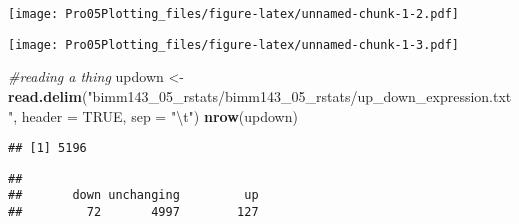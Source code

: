 \documentclass[]{article}
\newenvironment{Shaded}{\begin{snugshade}}{\end{snugshade}}
\newcommand{\CharTok}[1]{\textcolor[rgb]{0.31,0.60,0.02}{#1}}
\newcommand{\CommentTok}[1]{\textcolor[rgb]{0.56,0.35,0.01}{\textit{#1}}}
\newcommand{\DataTypeTok}[1]{\textcolor[rgb]{0.13,0.29,0.53}{#1}}
\newcommand{\KeywordTok}[1]{\textcolor[rgb]{0.13,0.29,0.53}{\textbf{#1}}}
\newcommand{\NormalTok}[1]{#1}
\newcommand{\OperatorTok}[1]{\textcolor[rgb]{0.81,0.36,0.00}{\textbf{#1}}}
\newcommand{\OtherTok}[1]{\textcolor[rgb]{0.56,0.35,0.01}{#1}}
\newcommand{\StringTok}[1]{\textcolor[rgb]{0.31,0.60,0.02}{#1}}
\begin{document}
\texttt{[image: Pro05Plotting\_files/figure-latex/unnamed-chunk-1-2.pdf]}

\begin{Shaded}
\end{Shaded}

\texttt{[image: Pro05Plotting\_files/figure-latex/unnamed-chunk-1-3.pdf]}

\begin{Shaded}
\begin{Highlighting}[]
\CommentTok{#reading a thing}
\NormalTok{updown <-}\StringTok{ }\KeywordTok{read.delim}\NormalTok{(}\StringTok{"bimm143_05_rstats/bimm143_05_rstats/up_down_expression.txt"}\NormalTok{,}
                     \DataTypeTok{header =} \OtherTok{TRUE}\NormalTok{,}
                     \DataTypeTok{sep =} \StringTok{"}\CharTok{\textbackslash{}t}\StringTok{"}\NormalTok{)}
\KeywordTok{nrow}\NormalTok{(updown)}
\end{Highlighting}
\end{Shaded}

\begin{verbatim}
## [1] 5196
\end{verbatim}

\begin{Shaded}
\end{Shaded}

\begin{verbatim}
## 
##       down unchanging         up 
##         72       4997        127
\end{verbatim}
\end{document}
